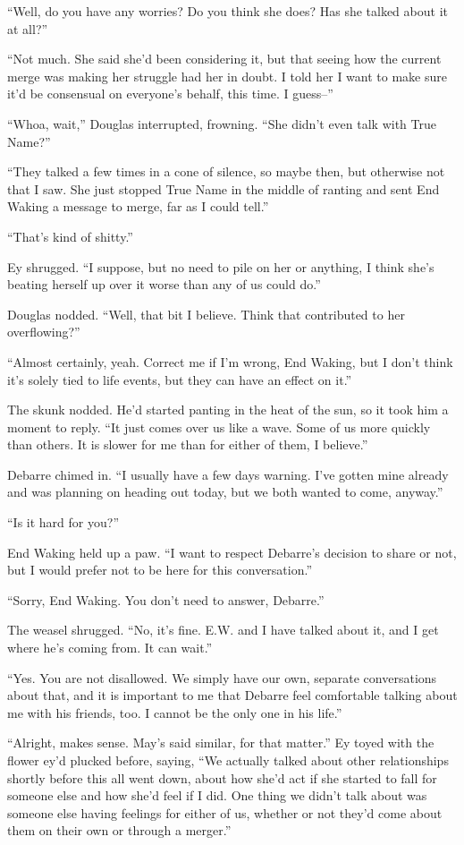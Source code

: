 ``Well, do you have any worries? Do you think she does? Has she talked about it at all?''

``Not much. She said she'd been considering it, but that seeing how the current merge was making her struggle had her in doubt. I told her I want to make sure it'd be consensual on everyone's behalf, this time. I guess--''

``Whoa, wait,'' Douglas interrupted, frowning. ``She didn't even talk with True Name?''

``They talked a few times in a cone of silence, so maybe then, but otherwise not that I saw. She just stopped True Name in the middle of ranting and sent End Waking a message to merge, far as I could tell.''

``That's kind of shitty.''

Ey shrugged. ``I suppose, but no need to pile on her or anything, I think she's beating herself up over it worse than any of us could do.''

Douglas nodded. ``Well, that bit I believe. Think that contributed to her overflowing?''

``Almost certainly, yeah. Correct me if I'm wrong, End Waking, but I don't think it's solely tied to life events, but they can have an effect on it.''

The skunk nodded. He'd started panting in the heat of the sun, so it took him a moment to reply. ``It just comes over us like a wave. Some of us more quickly than others. It is slower for me than for either of them, I believe.''

Debarre chimed in. ``I usually have a few days warning. I've gotten mine already and was planning on heading out today, but we both wanted to come, anyway.''

``Is it hard for you?''

End Waking held up a paw. ``I want to respect Debarre's decision to share or not, but I would prefer not to be here for this conversation.''

``Sorry, End Waking. You don't need to answer, Debarre.''

The weasel shrugged. ``No, it's fine. E.W. and I have talked about it, and I get where he's coming from. It can wait.''

``Yes. You are not disallowed. We simply have our own, separate conversations about that, and it is important to me that Debarre feel comfortable talking about me with his friends, too. I cannot be the only one in his life.''

``Alright, makes sense. May's said similar, for that matter.'' Ey toyed with the flower ey'd plucked before, saying, ``We actually talked about other relationships shortly before this all went down, about how she'd act if she started to fall for someone else and how she'd feel if I did. One thing we didn't talk about was someone else having feelings for either of us, whether or not they'd come about them on their own or through a merger.''

